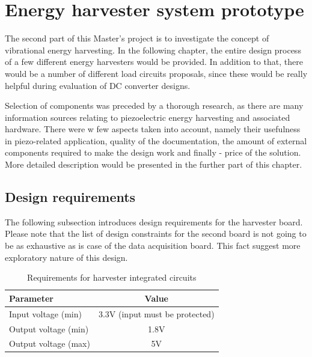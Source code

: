 \documentclass[12pt,a4paper]{article}
\begin{document}
\FloatBarrier

\section{Energy harvester system prototype}
The second part of this Master's project is to investigate the concept of vibrational energy harvesting. In the following chapter, the entire design process of a few different energy harvesters would be provided. In addition to that, there would be a number of different load circuits proposals, since these would be really helpful during evaluation of DC converter designs.
\par
Selection of components was preceded by a thorough research, as there are many information sources relating to piezoelectric energy harvesting and associated hardware. There were w few aspects taken into account, namely their usefulness in piezo-related application, quality of the documentation, the amount of external components required to make the design work and finally - price of the solution. More detailed description would be presented in the further part of this chapter.
\par


\subsection{Design requirements}
The following subsection introduces design requirements for the harvester board. Please note that the list of design constraints for the second board is not going to be as exhaustive as is case of the data acquisition board. This fact suggest more exploratory nature of this design.\par

\begin{table}[ht!]
\begin{tabular}{|l|c|}
\hline
\textbf{Parameter}	& \textbf{Value} 	\\ \hline
Input voltage  (min)  		& 3.3V (input must be protected)      \\ \hline
Output voltage (min)   	& 1.8V	\\ \hline
Output voltage (max)       	&  5V 		\\ \hline
\end{tabular}
\caption{Requirements for harvester integrated circuits}
\label{tab:harvesterrequirements}
\end{table}
\end{document}
